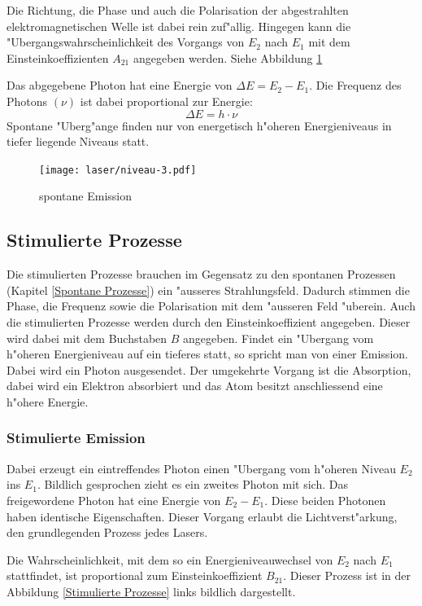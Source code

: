 \begin{refsection}
Die Richtung, die Phase und auch die Polarisation der abgestrahlten
elektromagnetischen Welle ist dabei rein zuf"allig.
Hingegen kann die "Ubergangswahrscheinlichkeit des Vorgangs von $E_2$ nach
$E_1$ mit dem Einsteinkoeffizienten $A_{21}$ angegeben werden.
Siehe Abbildung \ref{spontane Emission}

Das abgegebene Photon hat eine Energie von $\Delta E = E_2 - E_1$.
Die Frequenz des Photons $(\nu)$ ist dabei proportional zur Energie:
\[ \Delta E = h\cdot \nu\]
Spontane "Uberg"ange finden nur von energetisch h"oheren Energieniveaus in
tiefer liegende Niveaus statt\cite{Laserprinzip}.

\begin{figure}
\centering
\texttt{[image: laser/niveau-3.pdf]}
\caption{spontane Emission}
\label{spontane Emission}
\end{figure}


\subsection{Stimulierte Prozesse}
Die stimulierten Prozesse brauchen im Gegensatz zu den spontanen
Prozessen (Kapitel \ref{Spontane Prozesse}) ein "ausseres Strahlungsfeld.
Dadurch stimmen die Phase, die Frequenz sowie die Polarisation mit dem
"ausseren Feld "uberein.
Auch die stimulierten Prozesse werden durch den Einsteinkoeffizient angegeben.
Dieser wird dabei mit dem Buchstaben $B$ angegeben.
Findet ein "Ubergang vom h"oheren Energieniveau auf ein tieferes statt,
so spricht man von einer Emission. Dabei wird ein Photon ausgesendet.
Der umgekehrte Vorgang ist die Absorption, dabei wird ein Elektron absorbiert
und das Atom besitzt anschliessend eine h"ohere Energie.


\subsubsection{Stimulierte Emission}

Dabei erzeugt ein eintreffendes Photon einen "Ubergang vom h"oheren Niveau
$E_2$ ins $E_1$. 
Bildlich gesprochen zieht es ein zweites Photon mit sich.
Das freigewordene Photon hat eine Energie von $E_2 - E_1$.
Diese beiden Photonen haben identische Eigenschaften.
Dieser Vorgang erlaubt die Lichtverst"arkung, den grundlegenden Prozess jedes
Lasers. \cite{Laserphysik}

Die Wahrscheinlichkeit, mit dem so ein Energieniveauwechsel von $E_2$ nach
$E_1$ stattfindet, ist proportional zum Einsteinkoeffizient $B_{21}$.
Dieser Prozess ist in der Abbildung \ref{Stimulierte Prozesse} links bildlich
dargestellt.


\end{refsection}

